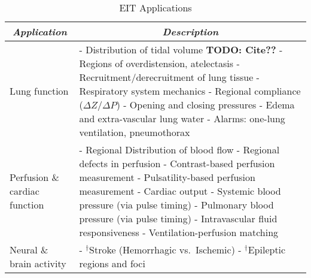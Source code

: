 \documentclass[12pt]{article} \usepackage[margin=3cm]{geometry} \usepackage[margin=20pt,font=small,labelfont=bf]{caption}\def\TBLWIDA{35mm}\def\TBLWIDB{95mm}
\newcommand{\TODO}[1]{{\bf TODO: #1}}
\begin{document}
\begin{table}
\caption{EIT Applications}
\label{tbl:EIT_Applications}
\centering
\begin{tabular}{p{\TBLWIDA}p{\TBLWIDB}}
\multicolumn{1}{c}{\em Application} &
\multicolumn{1}{c}{\em Description} \\
\hline
Lung function &
 - Distribution of tidal volume \TODO{Cite??}
      \newline
 - Regions of overdistension, atelectasis
                \cite{Gomez2012Overdistension, Costa??}
      \newline
 - Recruitment/derecruitment of lung tissue \cite{Frerichs2003??}
      \newline
 - Respiratory system mechanics 
      \newline
 - Regional compliance ($\Delta Z/\Delta P$) 
      \newline
 - Opening and closing pressures \cite{Pulletz??}
      \newline
 - Edema and extra-vascular lung water \cite{Trepte2016Edema}
      \newline
 - Alarms: one-lung ventilation, pneumothorax 
\\
    \hline
Perfusion  \& \newline
cardiac \newline function & 
 - Regional Distribution of blood flow 
      \newline
 - Regional defects in perfusion 
      \newline
 - Contrast-based perfusion measurement \cite{Frerichs2002Perfusion}
      \newline
 - Pulsatility-based perfusion measurement \cite{??}
      \newline
 - Cardiac output 
      \newline
 - Systemic blood pressure  (via pulse timing) \cite{Sola2011Central}
      \newline
 - Pulmonary blood pressure (via pulse timing) \cite{Proenca2016Noninvasive}
      \newline
 - Intravascular fluid responsiveness \cite{Trepte2017StrokeVolume}
      \newline
 - Ventilation-perfusion matching 
\\
    \hline
Neural \& \newline
brain activity &
 - $^\dagger$Stroke (Hemorrhagic vs.\ Ischemic) \cite{Romsauerova2006mfEIT}
      \newline
 - $^\dagger$Epileptic regions and foci 
      \newline

\end{tabular}
\end{table}
\end{document}
